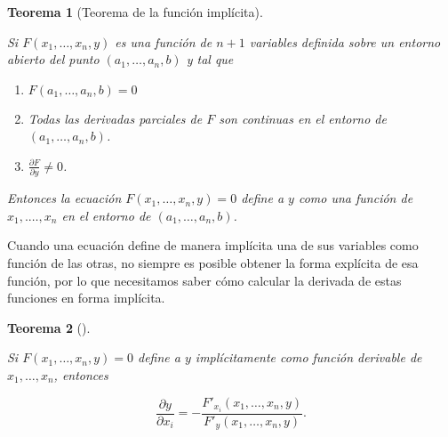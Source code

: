 \documentclass[
  a4paper,
]{scrreport}
\providecommand{\tightlist}{%
  \setlength{\itemsep}{0pt}\setlength{\parskip}{0pt}}\usepackage{longtable,booktabs,array}
\theoremstyle{definition}
\theoremstyle{definition}
\theoremstyle{definition}
\theoremstyle{plain}
\newtheorem{theorem}{Teorema}[chapter]
\theoremstyle{plain}
\theoremstyle{plain}
\theoremstyle{remark}
\begin{document}
\begin{theorem}[Teorema de la función
implícita]\protect\hypertarget{thm-funcion-implicita}{}\label{thm-funcion-implicita}

Si \(F(x_1,\ldots,x_n,y)\) es una función de \(n+1\) variables definida
sobre un entorno abierto del punto \((a_1,\ldots,a_n,b)\) y tal que

\begin{enumerate}
\def\labelenumi{\alph{enumi}.}
\tightlist
\item
  \(F(a_1,\ldots,a_n,b)=0\)
\item
  Todas las derivadas parciales de \(F\) son continuas en el entorno de
  \((a_1,\ldots,a_n,b)\).
\item
  \(\frac{\partial F}{\partial y}\neq 0\).
\end{enumerate}

Entonces la ecuación \(F(x_1,\ldots,x_n,y)=0\) define a \(y\) como una
función de \(x_1, .\ldots, x_n\) en el entorno de
\((a_1,\ldots,a_n,b)\).

\end{theorem}

Cuando una ecuación define de manera implícita una de sus variables como
función de las otras, no siempre es posible obtener la forma explícita
de esa función, por lo que necesitamos saber cómo calcular la derivada
de estas funciones en forma implícita.

\begin{theorem}[]\protect\hypertarget{thm-derivada-implicita-funcion-varias-variables}{}\label{thm-derivada-implicita-funcion-varias-variables}

Si \(F(x_1,\ldots,x_n,y)=0\) define a \(y\) implícitamente como función
derivable de \(x_1,\ldots,x_n\), entonces

\[
\frac{\partial y}{\partial x_i} = -\frac{F'_{x_i}(x_1,\ldots,x_n,y)}{F'_{y}(x_1,\ldots,x_n,y)}.
\]

\end{theorem}
\end{document}
